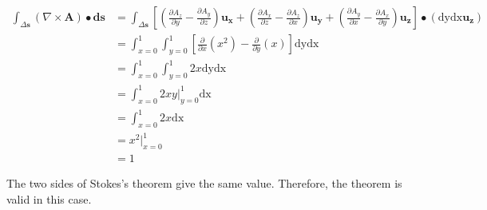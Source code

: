 \documentclass{article}
\begin{document}
\begin{equation*}
	\begin{split}
		\int_{\Delta \mathbf{s}} (\nabla \times \mathbf{A}) \bullet \mathbf{ds} & = \int_{\Delta \mathbf{s}} \left[
			\left(\frac{\partial A_z}{\partial y} - \frac{\partial A_y}{\partial z}\right) \mathbf{u_x}
			+ \left(\frac{\partial A_x}{\partial z} - \frac{\partial A_z}{\partial x}\right) \mathbf{u_y}
			+ \left(\frac{\partial A_y}{\partial x} - \frac{\partial A_x}{\partial y}\right) \mathbf{u_z}
			\right] \bullet (\text{dydx}\mathbf{u_z}) \\
		& = \int_{x=0}^1 \int_{y=0}^1 \left[\frac{\partial}{\partial x}(x^2) - \frac{\partial}{\partial y}(x)\right]\text{dydx} \\
		& = \int_{x=0}^1 \int_{y=0}^1 2x \text{dydx} \\
		& = \int_{x=0}^1 2xy \rvert_{y=0}^1 \text{dx} \\
		& = \int_{x=0}^1 2x \text{dx} \\
		& = x^2 \rvert_{x=0}^1 \\
		& = 1
	\end{split}
\end{equation*}

The two sides of Stokes's theorem give the same value. Therefore, the theorem is valid in this case.
\end{document}
